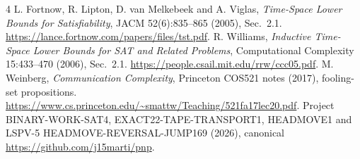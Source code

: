\documentclass[11pt]{article}
\begin{document}
\begin{thebibliography}{4}
 L. Fortnow, R. Lipton, D. van Melkebeek and A. Viglas, \emph{Time-Space Lower Bounds for Satisfiability}, JACM 52(6):835--865 (2005), Sec.~2.1. \url{https://lance.fortnow.com/papers/files/tst.pdf}.
 R. Williams, \emph{Inductive Time-Space Lower Bounds for SAT and Related Problems}, Computational Complexity 15:433--470 (2006), Sec.~2.1. \url{https://people.csail.mit.edu/rrw/ccc05.pdf}.
 M. Weinberg, \emph{Communication Complexity}, Princeton COS521 notes (2017), fooling-set propositions. \url{https://www.cs.princeton.edu/~smattw/Teaching/521fa17lec20.pdf}.
 Project BINARY-WORK-SAT4, EXACT22-TAPE-TRANSPORT1, HEADMOVE1 and LSPV-5 HEADMOVE-REVERSAL-JUMP169 (2026), canonical \url{https://github.com/j15marti/pnp}.
\end{thebibliography}
\end{document}
